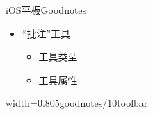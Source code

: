 \documentclass[fontset = none, t, aspectratio=169]{ctexbeamer}
\begin{document}
\begin{frame}{iOS平板}{Goodnotes}
  \begin{itemize}\itemsep=3pt
  \item \enquote{批注}工具
    \begin{itemize}
    \item 工具类型
    \item 工具属性
    \end{itemize}
  \end{itemize}
  \begin{center}
    \begin{annotationimage}{width=0.8\textwidth}{05goodnotes/10toolbar}

\end{annotationimage}
\end{center}
\end{frame}
\end{document}
